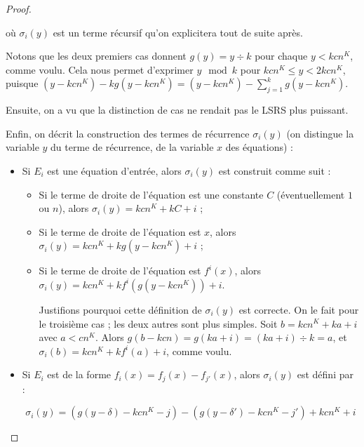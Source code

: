 \documentclass{article}
\begin{document}
\begin{proof}
\begin{enumerate}[itemsep=-1mm,leftmargin=2cm]
					où $\sigma_i(y)$ est un terme récursif qu'on explicitera tout de suite après. 
					
					Notons que les deux premiers cas donnent $g(y) = y \div k$ pour chaque $y < kcn^K$, comme voulu. Cela nous permet d'exprimer $y \mod{k}$ pour $kcn^K \leqslant y < 2kcn^K$, puisque $(y-kcn^K) - kg(y-kcn^K) = (y-kcn^K) - \sum_{j=1}^{k} g(y-kcn^K)$. 
					
					Ensuite, on a vu que la distinction de cas ne rendait pas le LSRS plus puissant. 
					
					Enfin, on décrit la construction des termes de récurrence $\sigma_i(y)$ (on distingue la variable $y$ du terme de récurrence, de la variable $x$ des équations) :
					
					\begin{itemize}[itemsep=-1mm, leftmargin=1cm]
						\item
							Si $E_i$ est une équation d'entrée, alors $\sigma_i(y)$ est construit comme suit :
					
							\begin{itemize}[itemsep=-1mm,leftmargin=1cm]
								\item %
								Si le terme de droite de l'équation est une constante $C$ (éventuellement $1$ ou $n$), alors $\sigma_i(y) = kcn^K + kC + i$ ;
								
								\item %
								Si le terme de droite de l'équation est $x$, alors $\sigma_i(y) = kcn^K + kg\left( y - kcn^K \right) + i$ ;
								
								\item %
								Si le terme de droite de l'équation est $f^i(x)$, alors $\sigma_i(y) = kcn^K + k f^i\left( g\left( y - kcn^K \right) \right) + i$.
								
								Justifions pourquoi cette définition de $\sigma_i(y)$ est correcte. On le fait pour le troisième cas ; les deux autres sont plus simples. Soit $b = kcn^K + ka + i$ avec $a < cn^K$. Alors $g(b-kcn) = g(ka + i) = (ka + i) \div k = a$, et $\sigma_i(b) = kcn^K + kf^i(a) + i$, comme voulu. 
							\end{itemize}
							
			
						\item
							Si $E_i$ est de la forme $f_i(x) = f_j(x) - f_{j'}(x)$, alors $\sigma_i(y)$ est défini par :
							
							\[
								\sigma_i(y) = \left( g(y - \delta) - k cn^K - j \right) - \left( g(y - \delta') - k cn^K - j' \right) + kcn^K + i
							\]
							

\end{itemize}
\end{enumerate}
\end{proof}
\end{document}
